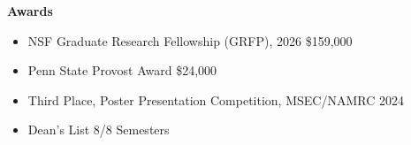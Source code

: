\begin{center}
    \textbf{Awards}
\end{center}

\begin{itemize}[noitemsep, topsep=0pt, partopsep=0pt, parsep=0pt]
    \item NSF Graduate Research Fellowship (GRFP), 2026 \hfill \$159,000
    \item Penn State Provost Award \hfill \$24,000
    \item Third Place, Poster Presentation Competition, MSEC/NAMRC 2024
    \item Dean's List 8/8 Semesters
\end{itemize}
